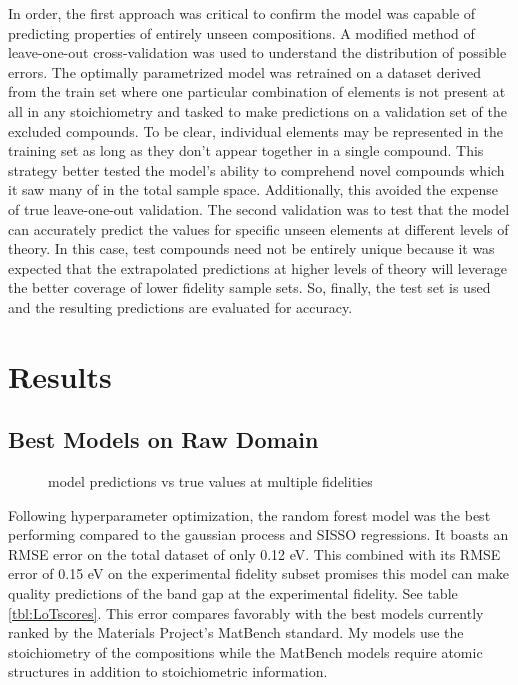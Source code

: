 In order, the first approach was critical to confirm the model was capable of predicting properties of entirely unseen compositions.
A modified method of leave-one-out cross-validation was used to understand the distribution of possible errors.
The optimally parametrized model was retrained on a dataset derived from the train set where one particular combination of elements is not present at all in any stoichiometry and tasked to make predictions on a validation set of the excluded compounds.
To be clear, individual elements may be represented in the training set as long as they don't appear together in a single compound.
This strategy better tested the model's ability to comprehend novel compounds which it saw many of in the total sample space.
Additionally, this avoided the expense of true leave-one-out validation.
The second validation was to test that the model can accurately predict the values for specific unseen elements at different levels of theory.
In this case, test compounds need not be entirely unique because it was expected that the extrapolated predictions at higher levels of theory will leverage the better coverage of lower fidelity sample sets.
So, finally, the test set is used and the resulting predictions are evaluated for accuracy.

\section{Results}
\label{sec:org7802582}
\subsection{Best Models on Raw Domain}
\label{sec:orgb2d5fd7}
 
\begin{figure}[htbp]
\centering

\caption{\label{fig:pairplots} model predictions vs true values at multiple fidelities}
\end{figure}

Following hyperparameter optimization, the random forest model was the best performing compared to the gaussian process and SISSO regressions.
It boasts an RMSE error on the total dataset of only 0.12 \unit{\electronvolt}.
This combined with its RMSE error of 0.15 \unit{\electronvolt} on the experimental fidelity subset promises this model can make quality predictions of the band gap at the experimental fidelity.
See table \ref{tbl:LoTscores}.
This error compares favorably with the best models currently ranked by the Materials Project's MatBench standard\autocite{dunn-2020-bench-mater}.
My models use the stoichiometry of the compositions while the MatBench models require atomic structures in addition to stoichiometric information.

